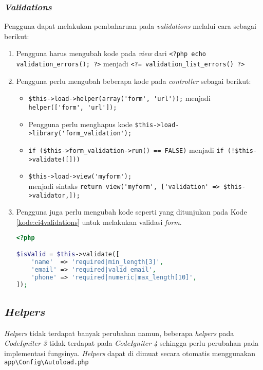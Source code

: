 \subsubsection{\textit{Validations}}
Pengguna dapat melakukan pembaharuan pada \textit{validations} melalui cara sebagai berikut:
\begin{enumerate}
\item Pengguna harus mengubah kode pada \textit{view} dari \verb|<?php echo validation_errors(); ?>| menjadi \verb|<?= validation_list_errors() ?>|
\item Pengguna perlu mengubah beberapa kode pada \textit{controller} sebagai berikut:
	\begin{itemize}
		\item \verb|$this->load->helper(array('form', 'url'));| menjadi \verb|helper(['form', 'url']);|
		\item Pengguna perlu menghapus kode \verb|$this->load->library('form_validation');|
		\item \verb|if ($this->form_validation->run() == FALSE)| menjadi \verb|if (!$this->validate([]))|
		\item \verb|$this->load->view('myform');| \\ menjadi sintaks  \verb|return view('myform', ['validation' => $this->validator,]);|
	\end{itemize}
	\item Pengguna juga perlu mengubah kode seperti yang ditunjukan pada Kode \ref{kode:ci4validations} untuk melakukan validasi \textit{form}.
	\begin{lstlisting}[language=PHP, caption=Perubahan kode untuk melakukan validasi. ,label=kode:ci4validations]
<?php

$isValid = $this->validate([
    'name'  => 'required|min_length[3]',
    'email' => 'required|valid_email',
    'phone' => 'required|numeric|max_length[10]',
]);
\end{lstlisting}
\end{enumerate}

\subsection{\textit{Helpers}}
 
\textit{Helpers} tidak terdapat banyak perubahan namun, beberapa \textit{helpers} pada \textit{CodeIgniter 3} tidak terdapat pada \textit{CodeIgniter 4} sehingga perlu perubahan pada implementasi fungsinya. \textit{Helpers} dapat di dimuat secara otomatis menggunakan \verb|app\Config\Autoload.php|

